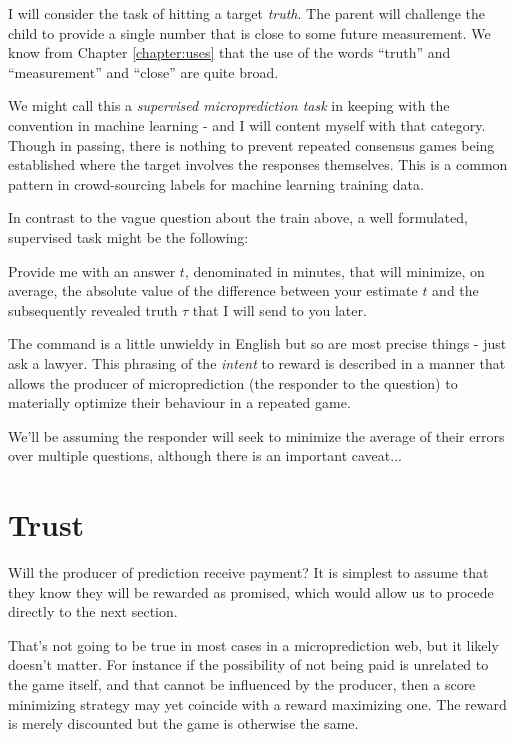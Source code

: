 I will consider the task of hitting a target {\em truth}. The parent will challenge the child to provide a single number that is close to some future measurement. We know from Chapter \ref{chapter:uses} that the use of the words ``truth'' and ``measurement'' and ``close'' are quite broad. 

We might call this a {\em supervised microprediction task} in keeping with the convention in machine learning - and I will content myself with that category. Though in passing, there is nothing to prevent repeated consensus games being established where the target involves the responses themselves. This is a common pattern in crowd-sourcing labels for machine learning training data. 

In contrast to the vague question about the train above, a well formulated, supervised task might be the following:
\begin{oldquote}
    Provide me with an answer $t$, denominated in minutes, that will minimize, on average, the absolute value of the difference between your estimate $t$ and the subsequently revealed truth $\tau$ that I will send to you later.  
\end{oldquote}

The command is a little unwieldy in English but so are most precise things - just ask a lawyer. This phrasing of the {\em intent} to reward is described in a manner that allows the producer of microprediction (the responder to the question) to materially optimize their behaviour in a repeated game.

We'll be assuming the responder will seek to minimize the average of their errors over multiple questions, although there is an important caveat...   

\section{Trust}

Will the producer of prediction receive payment? It is simplest to assume that they know they will be rewarded as promised, which would allow us to procede directly to the next section.  

That's not going to be true in most cases in a microprediction web, but it likely doesn't matter. For instance if the possibility of not being paid is unrelated to the game itself, and that cannot be influenced by the producer, then a score minimizing strategy may yet coincide with a reward maximizing one. The reward is merely discounted but the game is otherwise the same.  

